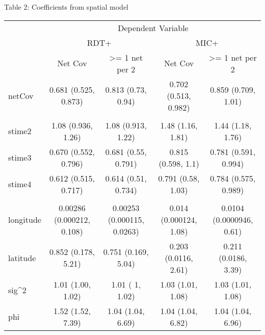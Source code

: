 \documentclass[smallextended]{svjour3}       %
\begin{document}
\color{black}

Table 2: Coefficients from spatial model

\begin{table}[H]
\centering\begingroup\fontsize{7}{9}\selectfont

\begin{tabular}{lcccc}
\toprule
\multicolumn{1}{c}{ } & \multicolumn{4}{c}{Dependent Variable} \\
\cmidrule(l{2pt}r{2pt}){2-5}
\multicolumn{1}{c}{ } & \multicolumn{2}{c}{RDT+} & \multicolumn{2}{c}{MIC+} \\
\cmidrule(l{2pt}r{2pt}){2-3} \cmidrule(l{2pt}r{2pt}){4-5}
  & Net Cov & >= 1 net per 2 & Net Cov & >= 1 net per 2\\
\midrule
netCov & 0.681 (0.525, 0.873) & 0.813 (0.73, 0.94) & 0.702 (0.513, 0.982) & 0.859 (0.709, 1.01)\\
\addlinespace[0.3em]
\multicolumn{5}{l}{\textbf{Time}}\\
\hspace{1em}stime2 & 1.08 (0.936, 1.26) & 1.08 (0.913, 1.22) & 1.48 (1.16, 1.81) & 1.44 (1.18, 1.76)\\
\hspace{1em}stime3 & 0.670 (0.552, 0.796) & 0.681 (0.55, 0.791) & 0.815 (0.598,  1.1) & 0.781 (0.591, 0.994)\\
\hspace{1em}stime4 & 0.612 (0.515, 0.717) & 0.614 (0.51, 0.734) & 0.791 (0.58, 1.03) & 0.784 (0.575, 0.989)\\
\addlinespace[0.3em]
\multicolumn{5}{l}{\textbf{Spatial}}\\
\hspace{1em}longitude & 0.00286 (0.000212, 0.108) & 0.00253 (0.000115, 0.0263) & 0.014 (0.000124, 1.08) & 0.0104 (0.0000946, 0.61)\\
\hspace{1em}latitude & 0.852 (0.178, 5.21) & 0.751 (0.169, 5.04) & 0.203 (0.0116, 2.61) & 0.211 (0.0186, 3.39)\\
\hspace{1em}sig\textasciicircum{}2 & 1.01 (1.00, 1.02) & 1.01 (   1, 1.02) & 1.03 (1.01, 1.08) & 1.03 (1.01, 1.08)\\
\hspace{1em}phi & 1.52 (1.52, 7.39) & 1.04 (1.04, 6.69) & 1.04 (1.04, 6.82) & 1.04 (1.04, 6.96)\\
\bottomrule
\end{tabular}\endgroup{}
\end{table}
\end{document}
